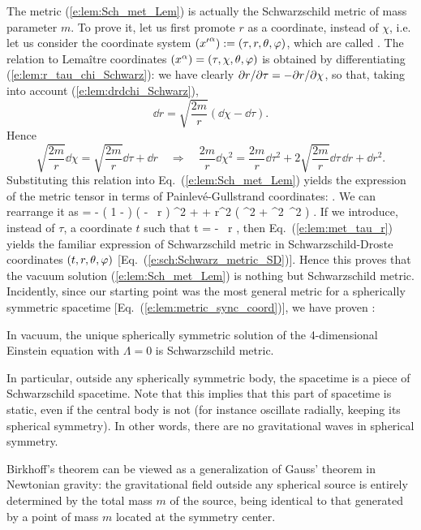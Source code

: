 The metric (\ref{e:lem:Sch_met_Lem}) is actually the
Schwarzschild metric of mass parameter $m$. To prove it, let us first
promote $r$ as a coordinate, instead of $\chi$, i.e. let us consider the
coordinate system $({x'}^\alpha):=(\tau,r,\theta,\varphi)$, which are called
.
The relation to Lemaître coordinates
$({x}^\alpha)=(\tau,\chi,\theta,\varphi)$ is obtained by differentiating (\ref{e:lem:r_tau_chi_Schwarz}):
we have clearly ${\partial r}/{\partial \tau} = - {\partial r}/{\partial \chi}$, so that, taking
into account (\ref{e:lem:drdchi_Schwarz}),
\[
    \dd r =  \sqrt{\frac{2m}{r}} (\dd\chi - \dd\tau) .
\]
Hence
\[
  \sqrt{\frac{2m}{r}}  \dd\chi = \sqrt{\frac{2m}{r}}  \dd\tau + \dd r
\quad \Longrightarrow \quad \frac{2m}{r} \dd\chi^2 = \frac{2m}{r} \dd\tau^2
    + 2 \sqrt{\frac{2m}{r}}  \dd\tau \, \dd r + \dd r^2 .
\]
Substituting this relation into Eq.~(\ref{e:lem:Sch_met_Lem}) yields
the expression of the metric tensor in terms of Painlevé-Gullstrand coordinates:
\be \label{e:lem:metric_PG}
    .
\ee
We can rearrange it as
\be
   =  - \left( 1 -  \right) \left( \dd\tau -
         \, \dd r \right) ^2
            + 
            + r^2 \left( \dd\th^2 + \sin^2\th\, \dd\ph^2 \right) .  \label{e:lem:met_tau_r}
\ee
If we introduce, instead of $\tau$, a coordinate $t$ such that
\be \label{e:lem:dt_dtau_dr}
    \dd t = \dd\tau -
         \, \dd r ,
\ee
then
Eq.~(\ref{e:lem:met_tau_r}) yields the familiar expression
of Schwarzschild metric in Schwarzschild-Droste coordinates $(t,r,\theta,\varphi)$
[Eq.~(\ref{e:sch:Schwarz_metric_SD})]. Hence this proves that
the vacuum solution (\ref{e:lem:Sch_met_Lem}) is nothing but
Schwarzschild metric. Incidently, since our starting point was
the most general metric for a spherically symmetric spacetime
[Eq.~(\ref{e:lem:metric_sync_coord})], we have proven
:
\begin{greybox}
In vacuum, the unique spherically symmetric solution of the 4-dimensional
Einstein equation with $\Lambda=0$ is Schwarzschild metric.
\end{greybox}
In particular, outside any spherically symmetric body, the spacetime
is a piece of Schwarz\-schild spacetime. Note that this implies that this part of
spacetime is static, even if the central body is not (for instance oscillate
radially, keeping its spherical symmetry). In other words, there are no
gravitational waves in spherical symmetry.
\begin{remark}
Birkhoff's theorem can be viewed as a generalization of Gauss' theorem in Newtonian gravity:
the gravitational field outside any spherical source is entirely determined by the total
mass $m$ of the source, being identical to that generated by a point of mass $m$
located at the symmetry center.
\end{remark}

